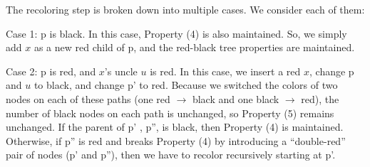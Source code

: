 \documentclass [12pt]{article}
\begin{document}
The recoloring step is broken down into multiple cases. We consider each of them:

Case 1: p is black. In this case, Property (4) is also maintained. So, we simply add $x$ as a new red child of p, and the red-black tree properties are maintained.

\begin{center}
\end{center}

Case 2: p is red, and $x$'s uncle $u$ is red. In this case, we insert a red $x$, change p and $u$ to black, and change p' to red. Because we switched the colors of two nodes on each of these paths (one red $\to$ black and one black $\to$ red), the number of black nodes on each path is unchanged, so Property (5) remains unchanged. If the parent of p' , p'', is black, then Property (4) is maintained. Otherwise, if p'' is red and breaks Property (4) by introducing a ``double-red'' pair of nodes (p' and p''), then we have to recolor recursively starting at p'.
\end{document}

